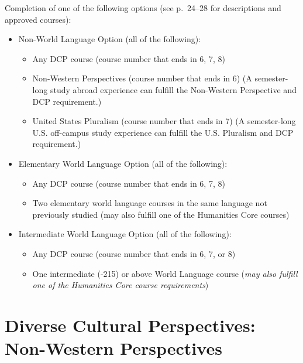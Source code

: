 \documentclass[
  letterpaper,
]{scrbook}
\providecommand{\tightlist}{%
  \setlength{\itemsep}{0pt}\setlength{\parskip}{0pt}}
\begin{document}
Completion of one of the following options (see p.~24--28 for
descriptions and approved courses):

\begin{itemize}
\tightlist
\item
  Non-World Language Option (all of the following):

  \begin{itemize}
  \tightlist
  \item
    Any DCP course (course number that ends in 6, 7, 8)
  \item
    Non-Western Perspectives (course number that ends in 6) (A
    semester-long study abroad experience can fulfill the Non-Western
    Perspective and DCP requirement.)
  \item
    United States Pluralism (course number that ends in 7) (A
    semester-long U.S. off-campus study experience can fulfill the U.S.
    Pluralism and DCP requirement.)
  \end{itemize}
\item
  Elementary World Language Option (all of the following):

  \begin{itemize}
  \tightlist
  \item
    Any DCP course (course number that ends in 6, 7, 8)
  \item
    Two elementary world language courses in the same language not
    previously studied (may also fulfill one of the Humanities Core
    courses)
  \end{itemize}
\item
  Intermediate World Language Option (all of the following):

  \begin{itemize}
  \tightlist
  \item
    Any DCP course (course number that ends in 6, 7, or 8)
  \item
    One intermediate (-215) or above World Language course (\emph{may
    also fulfill one of the Humanities Core course requirements})
  \end{itemize}
\end{itemize}

\hypertarget{sec-diverse-cultural-perspectives-non-western}{%
\section{Diverse Cultural Perspectives: Non-Western
Perspectives}\label{sec-diverse-cultural-perspectives-non-western}}
\end{document}
